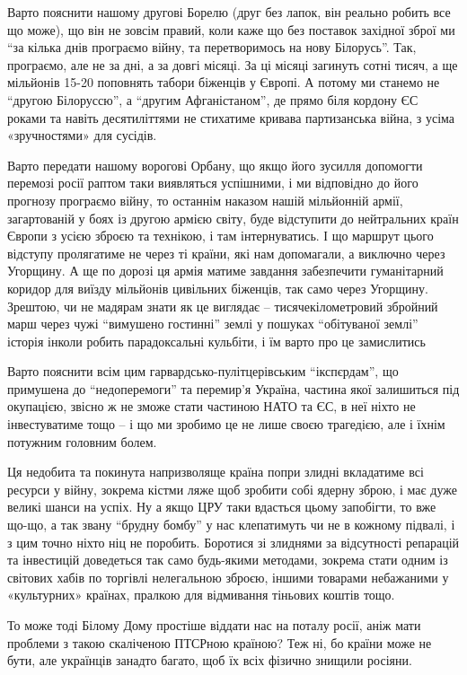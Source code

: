 Варто пояснити нашому другові Борелю (друг без лапок, він реально робить все що
може), що він не зовсім правий, коли каже що без поставок західної зброї ми \enquote{за
кілька днів програємо війну, та перетворимось на нову Білорусь}. Так,
програємо, але не за дні, а за довгі місяці. За ці місяці загинуть сотні тисяч,
а ще мільйонів 15-20 поповнять табори біженців у Європі. А потому ми станемо не
\enquote{другою Білоруссю}, а \enquote{другим Афганістаном}, де прямо біля кордону ЄС роками та
навіть десятиліттями не стихатиме кривава партизанська війна, з усіма
«зручностями» для сусідів.

Варто передати нашому ворогові Орбану, що якщо його зусилля допомогти перемозі
росії раптом таки виявляться успішними, і ми відповідно до його прогнозу
програємо війну, то останнім наказом нашій мільйонній армії, загартованій у
боях із другою армією світу, буде відступити до нейтральних країн Європи з
усією зброєю та технікою, і там інтернуватись. І що маршрут цього відступу
пролягатиме не через ті країни, які нам допомагали, а виключно через Угорщину.
А ще по дорозі ця армія матиме завдання забезпечити гуманітарний коридор для
виїзду мільйонів цивільних біженців, так само через Угорщину. Зрештою, чи не
мадярам знати як це виглядає – тисячекілометровий збройний марш через чужі
\enquote{вимушено гостинні} землі у пошуках \enquote{обітуваної землі} 🙂 історія інколи робить
парадоксальні кульбіти, і їм варто про це замислитись 🙂

Варто пояснити всім цим гарвардсько-пулітцерівським \enquote{ікспєрдам}, що примушена
до \enquote{недоперемоги} та перемир'я Україна, частина якої залишиться під окупацією,
звісно ж не зможе стати частиною НАТО та ЄС, в неї ніхто не інвестуватиме тощо
– і що ми зробимо це не лише своєю трагедією, але і їхнім потужним головним
болем.

Ця недобита та покинута напризволяще країна попри злидні вкладатиме всі ресурси
у війну, зокрема кістми ляже щоб зробити собі ядерну зброю, і має дуже великі
шанси на успіх. Ну а якщо ЦРУ таки вдасться цьому запобігти, то вже що-що, а
так звану \enquote{брудну бомбу} у нас клепатимуть чи не в кожному підвалі, і з цим
точно ніхто ніц не поробить. Боротися зі злиднями за відсутності репарацій та
інвестицій доведеться так само будь-якими методами, зокрема стати одним із
світових хабів по торгівлі нелегальною зброєю, іншими товарами небажаними у
«культурних» країнах, пралкою для відмивання тіньових коштів тощо.

То може тоді Білому Дому простіше віддати нас на поталу росії, аніж мати
проблеми з такою скаліченою ПТСРною країною? Теж ні, бо країни може не бути,
але українців занадто багато, щоб їх всіх фізично знищили росіяни.

